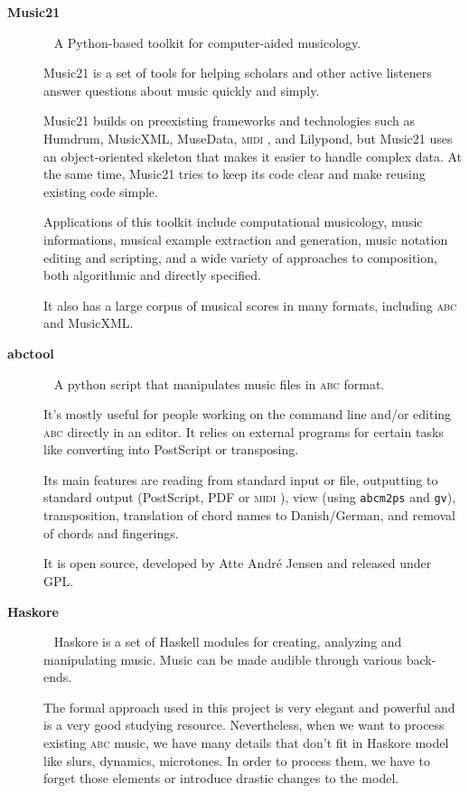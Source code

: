 \documentclass[a4paper,UKenglish]{oasics}
\newcommand{\abc}{\textsc{abc}}
\newcommand{\midi}{\textsc{midi} }
\newcommand{\abcmtops}{\texttt{abcm2ps}}
\begin{document}
\begin{description}
      \item[\textbf{Music21}]~\cite{music21:Online}
        A Python-based toolkit for computer-aided musicology.
        
        Music21 is a set of tools for helping scholars and other active listeners answer questions
        about music quickly and simply.

        Music21 builds on preexisting frameworks and technologies such as Humdrum, MusicXML,
        MuseData, \midi, and Lilypond, but Music21 uses an object-oriented skeleton that makes it
        easier to handle complex data. At the same time, Music21 tries to keep its code clear and
        make reusing existing code simple.

        Applications of this toolkit include computational musicology, music informations, musical
        example extraction and generation, music notation editing and scripting, and a wide variety
        of approaches to composition, both algorithmic and directly specified.

        It also has a large corpus of musical scores in many formats, including \abc{} and
        MusicXML.
        
      \item[\textbf{abctool}]~\cite{abctool:Online}
        A python script that manipulates music files in \abc{} format.

        It's mostly useful for people working on the command line and/or editing \abc{} directly in an editor. It relies on external programs for certain tasks like
        converting into PostScript or transposing.

        Its main features are reading from standard input or file, outputting to standard output
        (PostScript, PDF or \midi), view (using \abcmtops{} and \texttt{gv}),
        transposition, translation of chord names to Danish/German, and removal of chords and
        fingerings.

        It is open source, developed by Atte André Jensen and released under GPL.
      \item[\textbf{Haskore}]~\cite{hudak1996haskore}
        Haskore is a set of Haskell modules for creating, analyzing and manipulating music. Music
        can be made audible through various back-ends.

        The formal approach used in this project is very elegant and powerful and is a very good
        studying resource. Nevertheless, when we want to process existing \abc{} music, we have many
        details that don't fit in Haskore model like slurs, dynamics, microtones. In order to
        process them, we have to forget those elements or introduce drastic changes to the model.
    \end{description}
\end{document}
